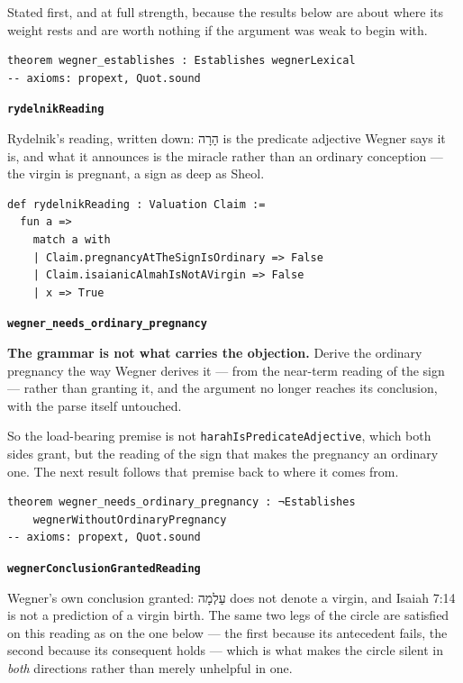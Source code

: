 \documentclass[11pt]{article}
\begin{document}
Stated first, and at full strength, because the results below are about where its weight rests and are worth nothing if the argument was weak to begin with.

{\small\begin{verbatim}
theorem wegner_establishes : Establishes wegnerLexical
-- axioms: propext, Quot.sound
\end{verbatim}}
\par\medskip\noindent\textbf{\texttt{rydelnik\allowbreak{}Reading}}\par\nobreak\noindent
Rydelnik’s reading, written down: הָרָה is the predicate adjective Wegner says it is, and what it announces is the miracle rather than an ordinary conception — the virgin is pregnant, a sign as deep as Sheol.

{\small\begin{verbatim}
def rydelnikReading : Valuation Claim :=
  fun a =>
    match a with
    | Claim.pregnancyAtTheSignIsOrdinary => False
    | Claim.isaianicAlmahIsNotAVirgin => False
    | x => True
\end{verbatim}}
\par\medskip\noindent\textbf{\texttt{wegner\_\allowbreak{}needs\_\allowbreak{}ordinary\_\allowbreak{}pregnancy}}\par\nobreak\noindent
\textbf{The grammar is not what carries the objection.} Derive the ordinary pregnancy the way Wegner derives it — from the near-term reading of the sign — rather than granting it, and the argument no longer reaches its conclusion, with the parse itself untouched.

So the load-bearing premise is not \texttt{harah\allowbreak{}Is\allowbreak{}Predicate\allowbreak{}Adjective}, which both sides grant, but the reading of the sign that makes the pregnancy an ordinary one. The next result follows that premise back to where it comes from.

{\small\begin{verbatim}
theorem wegner_needs_ordinary_pregnancy : ¬Establishes
    wegnerWithoutOrdinaryPregnancy
-- axioms: propext, Quot.sound
\end{verbatim}}
\par\medskip\noindent\textbf{\texttt{wegner\allowbreak{}Conclusion\allowbreak{}Granted\allowbreak{}Reading}}\par\nobreak\noindent
Wegner’s own conclusion granted: עַלְמָה does not denote a virgin, and Isaiah 7:14 is not a prediction of a virgin birth. The same two legs of the circle are satisfied on this reading as on the one below — the first because its antecedent fails, the second because its consequent holds — which is what makes the circle silent in \emph{both} directions rather than merely unhelpful in one.
\end{document}
